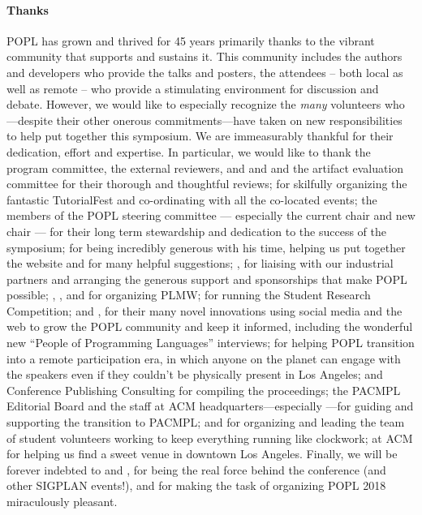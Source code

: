\paragraph{Thanks}
%
POPL has grown and thrived for 45 years primarily thanks to
the vibrant community that supports and sustains it.
%
This community includes the authors and developers who
provide the talks and posters, the attendees -- both local
as well as remote -- who provide a stimulating environment
for discussion and debate.
%
However, we would like to especially recognize the \emph{many}
volunteers who---despite their other onerous commitments---have
taken on new responsibilities to help put together this symposium.
%
We are immeasurably thankful for their dedication, effort and expertise.
%
In particular, we would like to thank
%
the program committee, the external reviewers,
and  and 
and the artifact evaluation committee for their
thorough and thoughtful reviews;
%
 for skilfully organizing
the fantastic TutorialFest and co-ordinating with
all the co-located events;
%
the members of the POPL steering committee --- especially the current
chair  and new chair  ---
for their long term stewardship and dedication to the success
of the symposium;
%
 for being incredibly generous with his time,
helping us put together the website and for many helpful
suggestions;
%
, for liaising with our industrial
partners and arranging the generous support and
sponsorships that make POPL possible;
%
, ,
 and 
for organizing PLMW;
%
 for running the Student Research Competition;
%
 and , for their many novel innovations
using social media and the web to grow the POPL community and
keep it informed, including the wonderful new ``People of Programming Languages''
interviews;
%
 for helping POPL transition into a remote participation
era, in which anyone on the planet can engage with the speakers even
if they couldn't be physically present in Los Angeles;
%
%
 and Conference Publishing Consulting
for compiling the proceedings;
%
the PACMPL Editorial Board and the staff at ACM
headquarters---especially ---for guiding
and supporting the transition to PACMPL;
%
 and  for organizing
and leading the team of student volunteers
working to keep everything running like clockwork;
%
 at ACM for helping us find a sweet
venue in downtown Los Angeles.
%
Finally, we will be forever indebted to
 and ,
for being the real force behind the conference
(and other SIGPLAN events!), and for making the
task of organizing POPL 2018 miraculously pleasant.

